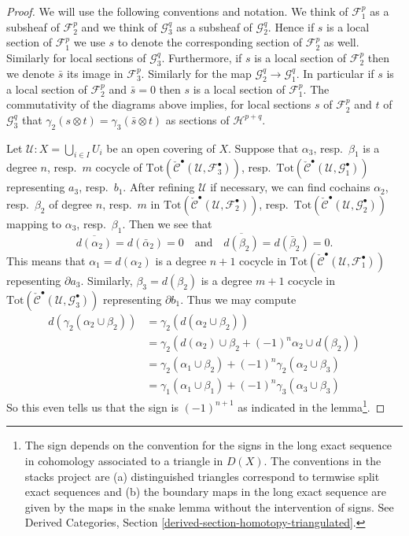 \begin{proof}
We will use the following conventions and notation. We think of
${\mathcal F}_1^p$ as a subsheaf of ${\mathcal F}_2^p$ and we think of
${\mathcal G}_3^q$ as a subsheaf of ${\mathcal G}_2^q$. Hence if $s$ is
a local section of ${\mathcal F}_1^p$ we use $s$ to denote
the corresponding section of ${\mathcal F}_2^p$ as well. Similarly
for local sections of ${\mathcal G}_3^q$. Furthermore,
if $s$ is a local section of ${\mathcal F}_2^p$ then we denote
$\bar s$ its image in ${\mathcal F}_3^p$. Similarly for the
map ${\mathcal G}_2^q \to {\mathcal G}^q_1$. In particular if
$s$ is a local section of ${\mathcal F}_2^p$ and $\bar s = 0$
then $s$ is a local section of ${\mathcal F}_1^p$. The commutativity
of the diagrams above implies, for local sections $s$ of
${\mathcal F}_2^p$ and $t$ of ${\mathcal G}_3^q$ that
$\gamma_2(s \otimes t) = \gamma_3(\bar s \otimes t)$ as sections of
${\mathcal H}^{p + q}$.

\medskip\noindent
Let ${\mathcal U} : X =  \bigcup_{i \in I} U_i$
be an open covering of $X$. Suppose that $\alpha_3$,
resp.\ $\beta_1$ is a degree $n$, resp.\ $m$ cocycle of
$\text{Tot}(
\check{\mathcal{C}}^\bullet({\mathcal U}, {\mathcal F}_3^\bullet))$,
resp.\ $\text{Tot}(
\check{\mathcal{C}}^\bullet({\mathcal U}, {\mathcal G}_1^\bullet))$
representing $a_3$, resp.\ $b_1$. After refining $\mathcal{U}$ if necessary,
we can find cochains $\alpha_2$, resp.\ $\beta_2$ of
degree $n$, resp.\ $m$ in
$\text{Tot}(
\check{\mathcal{C}}^\bullet({\mathcal U}, {\mathcal F}_2^\bullet))$,
resp.\ $\text{Tot}(
\check{\mathcal{C}}^\bullet({\mathcal U}, {\mathcal G}_2^\bullet))$
mapping to $\alpha_3$, resp.\ $\beta_1$.
Then we see that
$$
\overline{d(\alpha_2)} = d(\bar \alpha_2) = 0
\quad\text{and}\quad
\overline{d(\beta_2)} = d(\bar \beta_2) = 0.
$$
This means that $\alpha_1 = d(\alpha_2)$ is a degree $n + 1$ cocycle in
$\text{Tot}(\check{\mathcal{C}}^\bullet({\mathcal U}, {\mathcal F}_1^\bullet))$
repesenting $\partial a_3$. Similarly, $\beta_3 = d(\beta_2)$ is
a degree $m + 1$ cocycle in
$\text{Tot}(\check{\mathcal{C}}^\bullet({\mathcal U}, {\mathcal G}_3^\bullet))$
representing $\partial b_1$.
Thus we may compute
\begin{align*}
d(\gamma_2(\alpha_2 \cup \beta_2))
& =
\gamma_2(d(\alpha_2 \cup \beta_2))
\\
& =
\gamma_2(d(\alpha_2) \cup \beta_2 + (-1)^n \alpha_2 \cup d(\beta_2) )
\\
& =
\gamma_2( \alpha_1 \cup \beta_2)  + (-1)^n \gamma_2( \alpha_2 \cup \beta_3)
\\
& =
\gamma_1(\alpha_1 \cup \beta_1) + (-1)^n \gamma_3(\alpha_3 \cup \beta_3)
\end{align*}
So this even tells us that the sign is $(-1)^{n + 1}$ as indicated
in the lemma\footnote{The sign depends on the convention for the
signs in the long exact sequence in cohomology associated to a triangle
in $D(X)$. The conventions in the stacks project are (a) distinguished
triangles correspond to termwise split exact sequences and (b) the boundary
maps in the long exact sequence are given by the maps in the snake lemma
without the intervention of signs. See
Derived Categories, Section \ref{derived-section-homotopy-triangulated}.}.
\end{proof}
